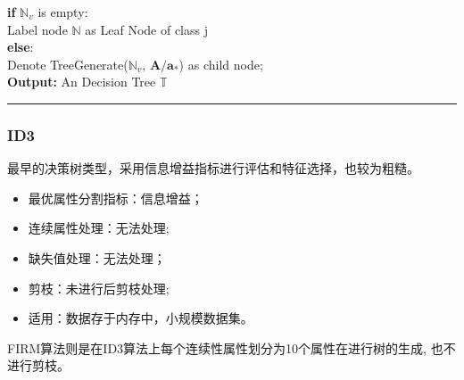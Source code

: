 \documentclass[a4paper]{article}
\begin{document}
			\hspace*{48pt}	\textbf{if} $\mathbb{N}_v$ is empty: \\
			\hspace*{64pt}	Label node $\mathbb{N}$ as Leaf Node of class j\\
			\hspace*{48pt}	\textbf{else}:\\
			\hspace*{64pt}	Denote TreeGenerate($\mathbb{N}_v,\, \textbf{A}\slash\textbf{a}_*$) as child node;\\
	\textbf{Output:} An Decision Tree $\mathbb{T}$\\
	\noindent\rule[0.1\baselineskip]{\textwidth}{0.75pt}
		\subsubsection{ID3}
		最早的决策树类型，采用信息增益指标进行评估和特征选择，也较为粗糙。
		  	\begin{itemize}
		    	\item 	最优属性分割指标：信息增益；
		    	\item 	连续属性处理：无法处理;
		    	\item 	缺失值处理：无法处理；
		    	\item 	剪枝：未进行后剪枝处理;
		    	\item 	适用：数据存于内存中，小规模数据集。
		  	\end{itemize}
		FIRM算法则是在ID3算法上每个连续性属性划分为10个属性在进行树的生成, 也不进行剪枝。	
\end{document}
